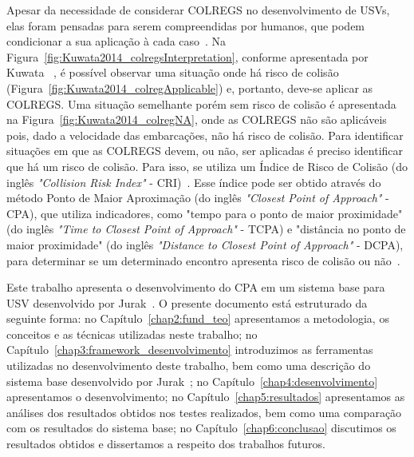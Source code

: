     Apesar da necessidade de considerar COLREGS no desenvolvimento de USVs, elas foram pensadas para serem compreendidas por humanos, que podem condicionar a sua aplicação à cada caso~\cite{Kuwata2014Safe}. Na Figura~\ref{fig:Kuwata2014_colregsInterpretation}, conforme apresentada por Kuwata \etal~\cite{Kuwata2014Safe}, é possível observar uma situação onde há risco de colisão (Figura~\ref{fig:Kuwata2014_colregApplicable}) e, portanto, deve-se aplicar as COLREGS. Uma situação semelhante porém sem risco de colisão é apresentada na Figura~\ref{fig:Kuwata2014_colregNA}, onde as COLREGS não são aplicáveis pois, dado a velocidade das embarcações, não há risco de colisão. Para identificar situações em que as COLREGS devem, ou não, ser aplicadas é preciso identificar que há um risco de colisão. Para isso, se utiliza um Índice de Risco de Colisão (do inglês \textit{"Collision Risk Index"} - CRI)~\cite{Huang2019Generalized}. Esse índice pode ser obtido através do método Ponto de Maior Aproximação (do inglês \textit{"Closest Point of Approach"} - CPA), que utiliza indicadores, como "tempo para o ponto de maior proximidade" (do inglês \textit{"Time to Closest Point of Approach"} - TCPA) e "distância no ponto de maior proximidade" (do inglês \textit{"Distance to Closest Point of Approach"} - DCPA), para determinar se um determinado encontro apresenta risco de colisão ou não~\cite{Huang2020Ship}. 
    
    Este trabalho apresenta o desenvolvimento do CPA em um sistema base para USV desenvolvido por Jurak~\cite{Jurak2020COLREGS}. O presente documento está estruturado da seguinte forma: no Capítulo~\ref{chap2:fund_teo} apresentamos a metodologia, os conceitos e as técnicas utilizadas neste trabalho; no Capítulo~\ref{chap3:framework_desenvolvimento} introduzimos as ferramentas utilizadas no desenvolvimento deste trabalho, bem como uma descrição do sistema base desenvolvido por Jurak~\cite{Jurak2020COLREGS}; 
    no Capítulo~\ref{chap4:desenvolvimento} apresentamos o desenvolvimento; no Capítulo~\ref{chap5:resultados} apresentamos as análises dos resultados obtidos nos testes realizados, bem como uma comparação com os resultados do sistema base; no Capítulo~\ref{chap6:conclusao} discutimos os resultados obtidos e dissertamos a respeito dos trabalhos futuros.
    
